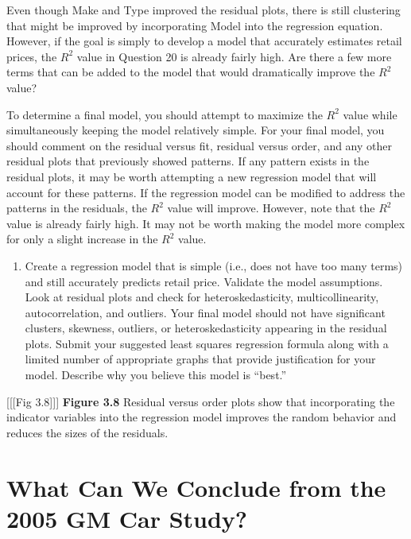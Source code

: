 \documentclass[
]{report}
\providecommand{\tightlist}{%
  \setlength{\itemsep}{0pt}\setlength{\parskip}{0pt}}
\theoremstyle{definition}
\theoremstyle{definition}
\theoremstyle{definition}
\theoremstyle{definition}
\theoremstyle{remark}
\begin{document}
Even though Make and Type improved the residual plots, there is still clustering that might be improved by incorporating Model into the regression equation. However, if the goal is simply to develop a model that accurately estimates retail prices, the \(R^2\) value in Question 20 is already fairly high. Are there a few more terms that can be added to the model that would dramatically improve the \(R^2\) value?

To determine a final model, you should attempt to maximize the \(R^2\) value while simultaneously keeping the model relatively simple. For your final model, you should comment on the residual versus fit, residual versus order, and any other residual plots that previously showed patterns. If any pattern exists in the residual plots, it may be worth attempting a new regression model that will account for these patterns. If the regression model can be modified to address the patterns in the residuals, the \(R^2\) value will improve. However, note that the \(R^2\) value is already fairly high. It may not be worth making the model more complex for only a slight increase in the \(R^2\) value.

\begin{enumerate}
\def\labelenumi{\arabic{enumi}.}
\setcounter{enumi}{20}
\tightlist
\item
  Create a regression model that is simple (i.e., does not have too many terms) and still accurately predicts retail price. Validate the model assumptions. Look at residual plots and check for heteroskedasticity, multicollinearity, autocorrelation, and outliers. Your final model should not have significant clusters, skewness, outliers, or heteroskedasticity appearing in the residual plots. Submit your suggested least squares regression formula along with a limited number of appropriate graphs that provide justification for your model. Describe why you believe this model is ``best.''
\end{enumerate}

{[}{[}{[}Fig 3.8{]}{]}{]}
\textbf{Figure 3.8} Residual versus order plots show that incorporating the indicator variables into the regression model improves the random behavior and reduces the sizes of the residuals.

\hypertarget{what-can-we-conclude-from-the-2005-gm-car-study}{%
\section{What Can We Conclude from the 2005 GM Car Study?}\label{what-can-we-conclude-from-the-2005-gm-car-study}}
\end{document}

